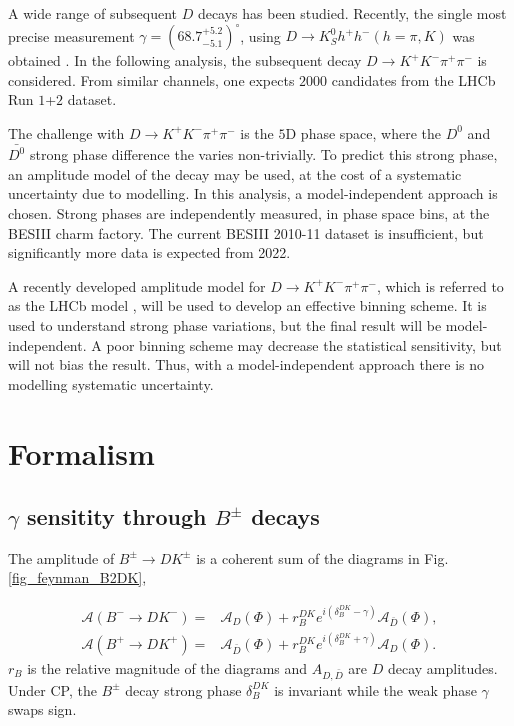 \documentclass[12pt, a4paper, notitlepage, onecolumn]{article}
\begin{document}
A wide range of subsequent $D$ decays has been studied. Recently, the single most precise measurement $\gamma = (68.7^{+5.2}_{-5.1})^\circ$, using $D\to K_S^0h^+h^-(h = \pi, K)$ was obtained \cite{cite_LHCbGGSZKSpipi}. In the following analysis, the subsequent decay $D\to K^+K^-\pi^+\pi^-$ is considered. From similar channels, one expects $2000$ candidates from the LHCb Run $1$+$2$ dataset.

The challenge with $D\to K^+K^-\pi^+\pi^-$ is the $5$D phase space, where the $D^0$ and $\bar{D^0}$ strong phase difference the varies non-trivially. To predict this strong phase, an amplitude model of the decay may be used, at the cost of a systematic uncertainty due to modelling. In this analysis, a model-independent approach is chosen. Strong phases are independently measured, in phase space bins, at the BESIII charm factory. The current BESIII 2010-11 dataset is insufficient, but significantly more data is expected from 2022.

A recently developed amplitude model for $D\to K^+K^-\pi^+\pi^-$, which is referred to as the LHCb model \cite{cite_AmplitudeModel}, will be used to develop an effective binning scheme. It is used to understand strong phase variations, but the final result will be model-independent. A poor binning scheme may decrease the statistical sensitivity, but will not bias the result. Thus, with a model-independent approach there is no modelling systematic uncertainty.

\section{Formalism}
\subsection{\texorpdfstring{$\gamma$}{gamma} sensitity through \texorpdfstring{$B^\pm$}{B} decays}
The amplitude of $B^\pm\to DK^\pm$ is a coherent sum of the diagrams in Fig. \ref{fig_feynman_B2DK},

\begin{align}
  \mathcal{A}(B^-\to DK^-) =& \mathcal{A}_D(\Phi) + r_B^{DK}e^{i(\delta_B^{DK} - \gamma)}\mathcal{A}_{\bar{D}}(\Phi), \label{eq_Bm2DKm} \\
  \mathcal{A}(B^+\to DK^+) =& \mathcal{A}_{\bar{D}}(\Phi) + r_B^{DK}e^{i(\delta_B^{DK} + \gamma)}\mathcal{A}_D(\Phi). \label{eq_Bp2DKp}
\end{align}
$r_B$ is the relative magnitude of the diagrams and $A_{D, \bar{D}}$ are $D$ decay amplitudes. Under CP, the $B^\pm$ decay strong phase $\delta_B^{DK}$ is invariant while the weak phase $\gamma$ swaps sign.
\end{document}
